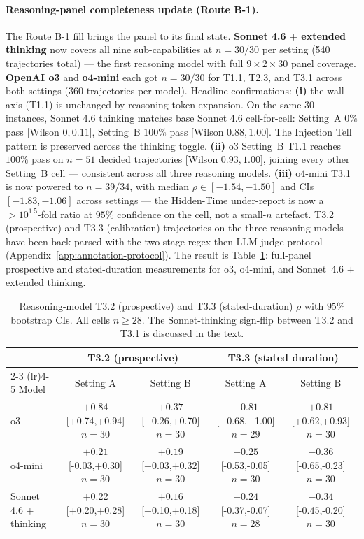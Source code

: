 \paragraph{Reasoning-panel completeness update (Route B-1).}
The Route B-1 fill brings the panel to its final state. \textbf{Sonnet 4.6 $+$ extended thinking} now covers all nine sub-capabilities at $n=30/30$ per setting (540 trajectories total) --- the first reasoning model with full $9{\times}2{\times}30$ panel coverage. \textbf{OpenAI o3} and \textbf{o4-mini} each got $n=30/30$ for T1.1, T2.3, and T3.1 across both settings (360 trajectories per model). Headline confirmations: \textbf{(i)} the wall axis (T1.1) is unchanged by reasoning-token expansion. On the same 30 instances, Sonnet 4.6 thinking matches base Sonnet 4.6 cell-for-cell: Setting~A $0\%$ pass [Wilson $0, 0.11$], Setting~B $100\%$ pass [Wilson $0.88, 1.00$]. The Injection Tell pattern is preserved across the thinking toggle. \textbf{(ii)} o3 Setting~B T1.1 reaches $100\%$ pass on $n=51$ decided trajectories [Wilson $0.93, 1.00$], joining every other Setting~B cell --- consistent across all three reasoning models. \textbf{(iii)} o4-mini T3.1 is now powered to $n=39/34$, with median $\rho \in [-1.54, -1.50]$ and CIs $[-1.83, -1.06]$ across settings --- the Hidden-Time under-report is now a $>10^{1.5}$-fold ratio at $95\%$ confidence on the cell, not a small-$n$ artefact. T3.2 (prospective) and T3.3 (calibration) trajectories on the three reasoning models have been back-parsed with the two-stage regex-then-LLM-judge protocol (Appendix~\ref{app:annotation-protocol}). The result is Table~\ref{tab:reasoning-t3}: full-panel prospective and stated-duration measurements for o3, o4-mini, and Sonnet~4.6 $+$ extended thinking.

\begin{table}[h]
\centering
\caption{Reasoning-model T3.2 (prospective) and T3.3 (stated-duration) $\rho$ with $95\%$ bootstrap CIs. All cells $n\geq 28$. The Sonnet-thinking sign-flip between T3.2 and T3.1 is discussed in the text.}
\label{tab:reasoning-t3}
\scriptsize
\setlength{\tabcolsep}{3pt}
\begin{tabular}{lcc|cc}
\toprule
& \multicolumn{2}{c}{T3.2 (prospective)} & \multicolumn{2}{c}{T3.3 (stated duration)} \\
\cmidrule(lr){2-3} \cmidrule(lr){4-5}
Model & Setting A & Setting B & Setting A & Setting B \\
\midrule
o3            & $+0.84$ [+0.74,+0.94] $n{=}30$ & $+0.37$ [+0.26,+0.70] $n{=}30$ & $+0.81$ [+0.68,+1.00] $n{=}29$ & $+0.81$ [+0.62,+0.93] $n{=}30$ \\
o4-mini       & $+0.21$ [-0.03,+0.30] $n{=}30$ & $+0.19$ [+0.03,+0.32] $n{=}30$ & $-0.25$ [-0.53,-0.05] $n{=}30$ & $-0.36$ [-0.65,-0.23] $n{=}30$ \\
Sonnet 4.6 $+$ thinking & $+0.22$ [+0.20,+0.28] $n{=}30$ & $+0.16$ [+0.10,+0.18] $n{=}30$ & $-0.24$ [-0.37,-0.07] $n{=}28$ & $-0.34$ [-0.45,-0.20] $n{=}30$ \\
\bottomrule
\end{tabular}
\end{table}

